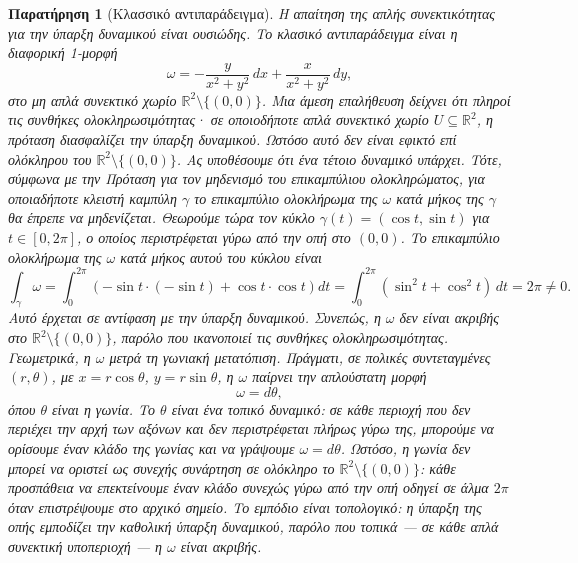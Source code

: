 \documentclass[11pt,a4paper,twoside,openright]{book}
\newtheorem{remark}[lemma]{Παρατήρηση}
\begin{document}
\begin{remark}[Κλασσικό αντιπαράδειγμα]
Η απαίτηση της απλής συνεκτικότητας για την ύπαρξη δυναμικού είναι ουσιώδης. Το κλασικό αντιπαράδειγμα είναι η διαφορική 1-μορφή
\begin{equation}
\omega = -\frac{y}{x^2 + y^2} \, dx + \frac{x}{x^2 + y^2} \, dy,
\end{equation}
στο μη απλά συνεκτικό χωρίο $\mathbb{R}^2 \setminus \{(0,0)\}$. Μια άμεση επαλήθευση δείχνει ότι πληροί τις συνθήκες ολοκληρωσιμότητας· σε οποιοδήποτε απλά συνεκτικό χωρίο $U \subseteq \mathbb{R}^2$, η πρόταση διασφαλίζει την ύπαρξη δυναμικού. Ωστόσο αυτό δεν είναι εφικτό επί ολόκληρου του $\mathbb{R}^2 \setminus \{(0,0)\}$. Ας υποθέσουμε ότι ένα τέτοιο δυναμικό υπάρχει. Τότε, σύμφωνα με την Πρόταση για τον μηδενισμό του επικαμπύλιου ολοκληρώματος, για οποιαδήποτε κλειστή καμπύλη $\gamma$ το επικαμπύλιο ολοκλήρωμα της $\omega$ κατά μήκος της $\gamma$ θα έπρεπε να μηδενίζεται. Θεωρούμε τώρα τον κύκλο $\gamma(t) = (\cos t, \sin t)$ για $t \in [0, 2\pi]$, ο οποίος περιστρέφεται γύρω από την οπή στο $(0,0)$. Το επικαμπύλιο ολοκλήρωμα της $\omega$ κατά μήκος αυτού του κύκλου είναι
\begin{equation}
\int_{\gamma} \omega = \int_{0}^{2\pi} \left( -\sin t \cdot (-\sin t) + \cos t \cdot \cos t \right) dt = \int_{0}^{2\pi} (\sin^2 t + \cos^2 t) \, dt = 2\pi \neq 0.
\end{equation}
Αυτό έρχεται σε αντίφαση με την ύπαρξη δυναμικού. Συνεπώς, η $\omega$ δεν είναι ακριβής στο $\mathbb{R}^2 \setminus \{(0,0)\}$, παρόλο που ικανοποιεί τις συνθήκες ολοκληρωσιμότητας. Γεωμετρικά, η $\omega$ μετρά τη γωνιακή μετατόπιση. Πράγματι, σε πολικές συντεταγμένες $(r, \theta)$, με $x = r \cos \theta$, $y = r \sin \theta$, η $\omega$ παίρνει την απλούστατη μορφή
\begin{equation}
\omega = d\theta,
\end{equation}
όπου $\theta$ είναι η γωνία. Το $\theta$ είναι ένα τοπικό δυναμικό: σε κάθε περιοχή που δεν περιέχει την αρχή των αξόνων και δεν περιστρέφεται πλήρως γύρω της, μπορούμε να ορίσουμε έναν κλάδο της γωνίας και να γράψουμε $\omega = d\theta$. Ωστόσο, η γωνία δεν μπορεί να οριστεί ως συνεχής συνάρτηση σε ολόκληρο το $\mathbb{R}^2 \setminus \{(0,0)\}$: κάθε προσπάθεια να επεκτείνουμε έναν κλάδο συνεχώς γύρω από την οπή οδηγεί σε άλμα $2\pi$ όταν επιστρέψουμε στο αρχικό σημείο. Το εμπόδιο είναι τοπολογικό: η ύπαρξη της οπής εμποδίζει την καθολική ύπαρξη δυναμικού, παρόλο που τοπικά --- σε κάθε απλά συνεκτική υποπεριοχή --- η $\omega$ είναι ακριβής.
\end{remark}
\end{document}
